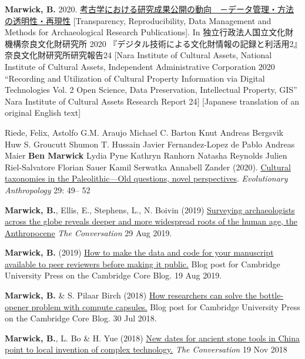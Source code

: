 \documentclass[11pt,article,oneside]{memoir}
\begin{document}
{{{\ind \textbf{Marwick, B.} 2020. \href{http://doi.org/10.24484/sitereports.69974}{考古学における研究成果公開の動向　－データ管理・方法の透明性・再現性} [Transparency, Reproducibility, Data Management and Methods for Archaeological Research Publications]. In 独立行政法人国立文化財機構奈良文化財研究所 2020 『デジタル技術による文化財情報の記録と利活用2』奈良文化財研究所研究報告24 [Nara Institute of Cultural Assets, National Institute of Cultural Assets, Independent Administrative Corporation 2020 “Recording and Utilization of Cultural Property Information via Digital Technologies Vol. 2 Open Science, Data Preservation, Intellectual Property, GIS” Nara Institute of Cultural Assets Research Report 24] [Japanese translation of an original English text]

\ind Riede, Felix, Astolfo G.M. Araujo Michael C. Barton Knut Andreas Bergsvik Huw S. Groucutt Shumon T. Hussain Javier Fernandez‐Lopez de Pablo Andreas Maier \textbf{Ben Marwick} Lydia Pyne Kathryn Ranhorn Natasha Reynolds Julien Riel‐Salvatore Florian Sauer Kamil Serwatka Annabell Zander (2020). \href{https://doi.org/10.1002/evan.21819}{Cultural taxonomies in the Paleolithic—Old questions, novel perspectives}. \textit{Evolutionary Anthropology} 29: 49– 52 

\ind \textbf{Marwick, B.}, Ellis, E., Stephens, L., N. Boivin (2019) \href{https://theconversation.com/surveying-archaeologists-across-the-globe-reveals-deeper-and-more-widespread-roots-of-the-human-age-the-anthropocene-122008}{Surveying archaeologists across the globe reveals deeper and more widespread roots of the human age, the Anthropocene} \textit{The Conversation} 29 Aug 2019.

\ind \textbf{Marwick, B.} (2019) \href{https://www.cambridge.org/core/blog/2019/08/19/how-to-make-the-data-and-code-for-your-manuscript-available-to-peer-reviewers-before-making-it-public/}{How to make the data and code for your manuscript available to peer reviewers before making it public.} Blog post for Cambridge University Press on the Cambridge Core Blog. 19 Aug 2019.

\ind \textbf{Marwick, B.} \& S. Pilaar Birch (2018) \href{https://www.cambridge.org/core/blog/2018/07/30/how-researchers-can-solve-the-bottle-opener-problem-with-compute-capsules/}{How researchers can solve the bottle-opener problem with compute capsules.} Blog post for Cambridge University Press on the Cambridge Core Blog. 30 Jul 2018. 

\ind \textbf{Marwick, B.}, L. Bo \& H. Yue (2018) \href{https://theconversation.com/new-dates-for-ancient-stone-tools-in-china-point-to-local-invention-of-complex-technology-106914}{New dates for ancient stone tools in China point to local invention of complex technology.} \textit{The Conversation} 19 Nov 2018 

}}}
\end{document}
